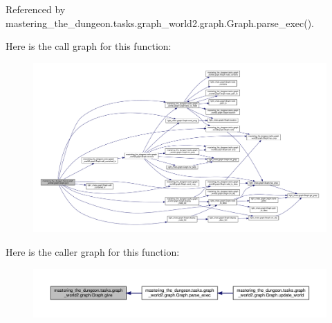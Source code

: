 Referenced by mastering\+\_\+the\+\_\+dungeon.\+tasks.\+graph\+\_\+world2.\+graph.\+Graph.\+parse\+\_\+exec().

Here is the call graph for this function\+:
\nopagebreak
\begin{figure}[H]
\begin{center}
\leavevmode
\includegraphics[width=350pt]{classmastering__the__dungeon_1_1tasks_1_1graph__world2_1_1graph_1_1Graph_aee862c606dc898f6f7336f9721b4151d_cgraph}
\end{center}
\end{figure}
Here is the caller graph for this function\+:
\nopagebreak
\begin{figure}[H]
\begin{center}
\leavevmode
\includegraphics[width=350pt]{classmastering__the__dungeon_1_1tasks_1_1graph__world2_1_1graph_1_1Graph_aee862c606dc898f6f7336f9721b4151d_icgraph}
\end{center}
\end{figure}
\mbox{\label{classmastering__the__dungeon_1_1tasks_1_1graph__world2_1_1graph_1_1Graph_afeb622f5376ff440089d5c294cb8a358}} 
